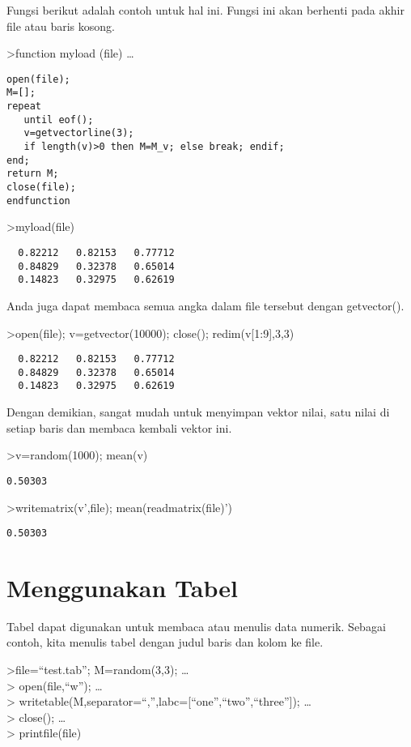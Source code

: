 \documentclass[
]{book}
\begin{document}
Fungsi berikut adalah contoh untuk hal ini. Fungsi ini akan berhenti pada akhir file atau baris kosong.

\textgreater function myload (file) \ldots{}

\begin{verbatim}
open(file);
M=[];
repeat
   until eof();
   v=getvectorline(3);
   if length(v)>0 then M=M_v; else break; endif;
end;
return M;
close(file);
endfunction
\end{verbatim}

\textgreater myload(file)

\begin{verbatim}
  0.82212   0.82153   0.77712 
  0.84829   0.32378   0.65014 
  0.14823   0.32975   0.62619 
\end{verbatim}

Anda juga dapat membaca semua angka dalam file tersebut dengan getvector().

\textgreater open(file); v=getvector(10000); close(); redim(v{[}1:9{]},3,3)

\begin{verbatim}
  0.82212   0.82153   0.77712 
  0.84829   0.32378   0.65014 
  0.14823   0.32975   0.62619 
\end{verbatim}

Dengan demikian, sangat mudah untuk menyimpan vektor nilai, satu nilai di setiap baris dan membaca kembali vektor ini.

\textgreater v=random(1000); mean(v)

\begin{verbatim}
0.50303
\end{verbatim}

\textgreater writematrix(v',file); mean(readmatrix(file)')

\begin{verbatim}
0.50303
\end{verbatim}

\chapter{Menggunakan Tabel}\label{menggunakan-tabel}

Tabel dapat digunakan untuk membaca atau menulis data numerik. Sebagai contoh, kita menulis tabel dengan judul baris dan kolom ke file.

\textgreater file=``test.tab''; M=random(3,3); \ldots{}\\
\textgreater{} open(file,``w''); \ldots{}\\
\textgreater{} writetable(M,separator=``,'',labc={[}``one'',``two'',``three''{]}); \ldots{}\\
\textgreater{} close(); \ldots{}\\
\textgreater{} printfile(file)
\end{document}
